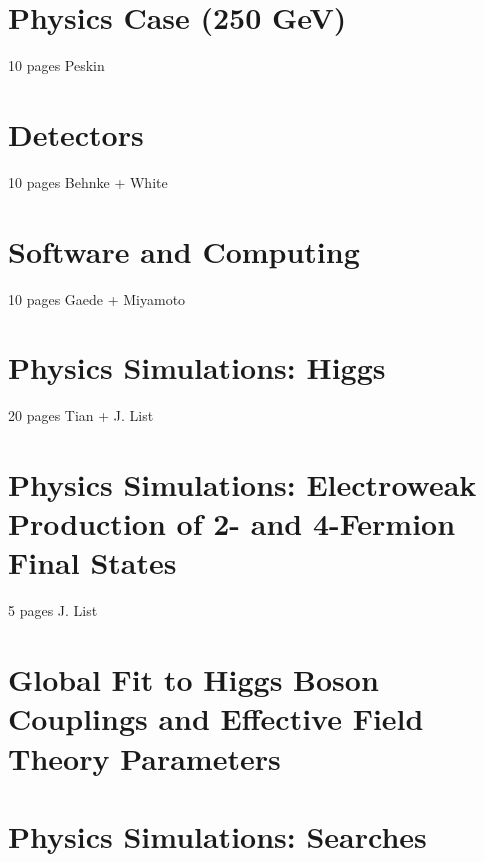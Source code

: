 \documentclass[%
 reprint,
nofootinbib,
 amsmath,amssymb,
 aps,
]{revtex4-1}
\begin{document}

   
   
\section{\label{sec:physics}Physics Case (250 GeV) }

10 pages Peskin
 

 
\section{\label{sec:detectors}Detectors }


  10 pages Behnke + White
  


\section{\label{sec:software}Software and Computing}

   10 pages Gaede + Miyamoto
   
   

\section{\label{sec:higgs}Physics Simulations: Higgs
}


  20 pages Tian + J. List
  
 

\section{\label{sec:ew}Physics Simulations: Electroweak Production of 2- and 4-Fermion Final States }


  5 pages J. List
  
  

\section{\label{sec:global}Global Fit to Higgs Boson Couplings and Effective Field Theory Parameters}

  



\section{\label{sec:searches}Physics Simulations: Searches }
\end{document}
